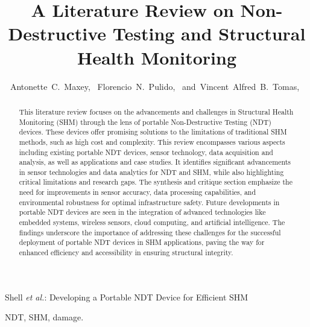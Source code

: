 \documentclass[journal, a4paper]{IEEEtran}
\begin{document}
\title{A Literature Review on Non-Destructive Testing and Structural Health Monitoring}


\author{Antonette~C.~Maxey,~
        Florencio~N.~Pulido,~
        and~Vincent~Alfred~B.~Tomas,~%
}



%
{Shell \MakeLowercase{\textit{et al.}}: Developing a Portable NDT Device for Efficient SHM}


\maketitle


\begin{abstract}
  This literature review focuses on the advancements and challenges in Structural Health Monitoring (SHM)
  through the lens of portable Non-Destructive Testing (NDT) devices.
  These devices offer promising solutions to the limitations of traditional SHM methods, such as high cost and complexity.
  This review encompasses various aspects including existing portable NDT devices, sensor technology,
  data acquisition and analysis, as well as applications and case studies. It identifies significant advancements
  in sensor technologies and data analytics for NDT and SHM, while also highlighting critical limitations and research gaps.
  The synthesis and critique section emphasize the need for improvements in sensor accuracy, data processing capabilities,
  and environmental robustness for optimal infrastructure safety. Future developments in portable NDT devices are seen
  in the integration of advanced technologies like embedded systems, wireless sensors, cloud computing, and artificial intelligence.
  The findings underscore the importance of addressing these challenges for the successful deployment of portable NDT
  devices in SHM applications, paving the way for enhanced efficiency and accessibility in ensuring structural integrity.
\end{abstract}


\begin{IEEEkeywords}
  NDT, SHM, damage.
\end{IEEEkeywords}
\end{document}
